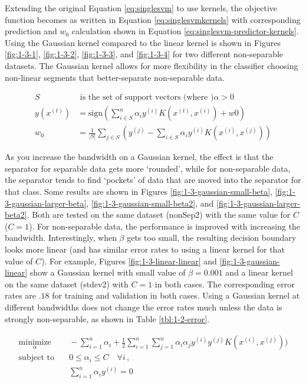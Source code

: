 \documentclass[10pt]{article}
\begin{document}
Extending the original Equation \ref{eq:singlesvm} to use kernels, the objective function becomes as written in Equation \ref{eq:singlesvmkernels} with corresponding prediction and $w_0$ calculation shown in Equation \ref{eq:singlesvm-predictor-kernels}. Using the Gaussian kernel compared to the linear kernel is shown in Figures \ref{fig:1-3-1}, \ref{fig:1-3-2}, \ref{fig:1-3-3}, and \ref{fig:1-3-4} for two different non-separable datasets. The Gaussian kernel allows for more flexibility in the classifier choosing non-linear segments that better-separate non-separable data. 

\begin{subequations}
\begin{align}
	S & \text{ is the set of support vectors (where )} \alpha > 0 \\
	y(x^{(t)}) &= \text{sign}\left(\sum_{i \in S}^n \alpha_i y^{(i)} K(x^{(t)}, x^{(i)}) + w0 \right)\\
	w_0 &= \frac{1}{|S|} \sum_{j \in S} \left(y^{(j)} - \sum_{i \in S} \alpha_i y^{(i)} K(x^{(i)}, x^{(j)}) \right)
\end{align}
\label{eq:singlesvm-predictor-kernels}
\end{subequations}

As you increase the bandwidth on a Gaussian kernel, the effect is that the separator for separable data gets more `rounded', while for non-separable data, the separator tends to find `pockets' of data that are moved into the separator for that class. Some results are shown in Figures \ref{fig:1-3-gaussian-small-beta}, \ref{fig:1-3-gaussian-larger-beta}, \ref{fig:1-3-gaussian-small-beta2}, and \ref{fig:1-3-gaussian-larger-beta2}. Both are tested on the same dataset (nonSep2) with the same value for $C$ ($C = 1$). For non-separable data, the performance is improved with increasing the bandwidth. Interestingly, when $\beta$ gets too small, the resulting decision boundary looks more linear (and has similar error rates to using a linear kernel for that value of $C$). For example, Figures \ref{fig:1-3-linear-linear} and \ref{fig:1-3-gaussian-linear} show a Gaussian kernel with small value of $\beta = 0.001$ and a linear kernel on the same dataset (stdev2) with $C = 1$ in both cases. The corresponding error rates are $.18$ for training and validation in both cases. 
Using a Gaussian kernel at different bandwidths does not change the error rates much unless the data is strongly non-separable, as shown in Table \ref{tbl:1-2-error}.

\begin{subequations}
\begin{align}
	\underset{\alpha}{\text{minimize}}
		& \quad -\sum_{i = 1}^n \alpha_i + \frac{1}{2} \sum_{i = 1}^n \sum_{j = 1}^n \alpha_i \alpha_j y^{(i)} y^{(j)} K(x^{(i)}, x^{(j)})) \\
	\text{subject to}
		& \quad 0 \leq \alpha_i \leq C \quad \forall i \,, \\
		& \quad \sum_{i = 1}^n \alpha_i y^{(i)} = 0
\end{align}
\label{eq:singlesvmkernels}
\end{subequations}
\end{document}

